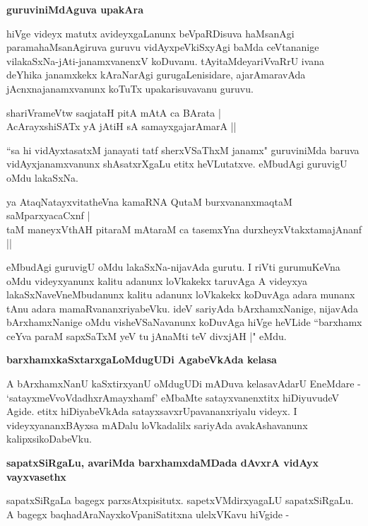 {\bigskip
\noindent
{\large\bf guruviniMdAguva upakAra}}\label{page91}
\medskip

\noindent
hiVge videyx matutx avideyxgaLanunx beVpaRDisuva haMsanAgi paramahaMsanAgiruva guruvu vidAyx\-peVkiSxyAgi baMda ceVtananige vilakaSxNa-jAti-janamxvanenxV koDuvanu. tAyitaMdeyariVvaRrU ivana deYhika janamxkekx kAraNarAgi gurugaLenisidare, ajarAmaravAda jAcnxnajanamxvanunx koTuTx upakarisuvavanu guruvu.

\begin{shloka}
shariVrameVtw saqjataH pitA mAtA ca BArata |\\\label{91}
AcArayxshiSATx yA jAtiH sA samayxgajarAmarA ||
\end{shloka}
\medskip

\noindent
``sa hi vidAyxtasatxM janayati tatf sherxVSaThxM janamx"\label{91} guruviniMda baruva vidAyxjanamxvanunx shAsatxrXgaLu etitx heVLu\-tatxve. eMbudAgi guruvigU oMdu lakaSxNa.

\begin{shloka}
ya AtaqNatayxvitatheVna kamaRNA QutaM burxvananxmaqtaM saMparxyacaCxnf |\\\label{91}
taM maneyxVthAH pitaraM mAtaraM ca tasemxYna durxheyxVtakxtamajAnanf ||
\end{shloka}

\noindent
eMbudAgi guruvigU oMdu lakaSxNa-nijavAda gurutu. I riVti gurumuKeVna oMdu videyx\-yanunx kalitu adanunx loVkakekx taruvAga A videyxya lakaSxNa\-veVneMbudanunx kalitu adanunx loVkakekx koDu\-vAga adara munanx tAnu adara mamaRvananxriyabeVku. ideV sariyAda bArxhamxNanige, nijavAda bArxhamxNanige oMdu visheVSaNavanunx koDuvAga hiVge heVLide ``barxhamx ceYva paraM sapxSaTxM\label{92} yeV tu jAnaMti teV divxjAH |" eMdu.

{\bigskip
\noindent
{\large\bf barxhamxkaSxtarxgaLoMdugUDi AgabeVkAda kelasa}}\label{page92}
\medskip

\noindent
A bArxhamxNanU kaSxtirxyanU oMdugUDi mADuva kelasavAdarU EneMdare - `satayxmeVvoVdadhxrAmayx\-hamf'\label{92} eMbaMte satayxvanenxtitx hiDiyuvudeV Agide. etitx hiDiyabeVkAda satayxsavxrUpavananxriyalu videyx. I videyxyananxBAyxsa mADalu loVkadalilx sariyAda avakAshavanunx kalipxsikoDabeVku.

{\bigskip
\noindent
{\large\bf sapatxSiRgaLu, avariMda barxhamxdaMDada dAvxrA vidAyx vayxvasethx}}\label{page92}
\medskip

\noindent
sapatxSiRgaLa bagegx parxsAtxpisitutx. sapetxVMdirxyagaLU sapatxSiRgaLu. A bagegx baqhadAraNayxkoVpaniSatitxna ulelxV\-Kavu hiVgide - 

